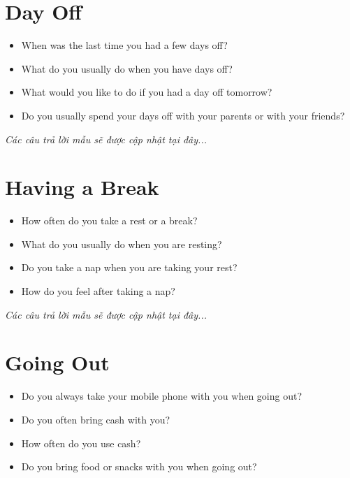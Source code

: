 \section{Day Off}
\begin{ieltsprompt}
\begin{itemize}[itemsep=4pt]
    \item When was the last time you had a few days off?
    \item What do you usually do when you have days off?
    \item What would you like to do if you had a day off tomorrow?
    \item Do you usually spend your days off with your parents or with your friends?
\end{itemize}
\end{ieltsprompt}

\vspace{1em}
\textit{Các câu trả lời mẫu sẽ được cập nhật tại đây...}
\vspace{2em}

\section{Having a Break}
\begin{ieltsprompt}
\begin{itemize}[itemsep=4pt]
    \item How often do you take a rest or a break?
    \item What do you usually do when you are resting?
    \item Do you take a nap when you are taking your rest?
    \item How do you feel after taking a nap?
\end{itemize}
\end{ieltsprompt}

\vspace{1em}
\textit{Các câu trả lời mẫu sẽ được cập nhật tại đây...}
\vspace{2em}

\section{Going Out}
\begin{ieltsprompt}
\begin{itemize}[itemsep=4pt]
    \item Do you always take your mobile phone with you when going out?
    \item Do you often bring cash with you?
    \item How often do you use cash?
    \item Do you bring food or snacks with you when going out?
\end{itemize}
\end{ieltsprompt}

